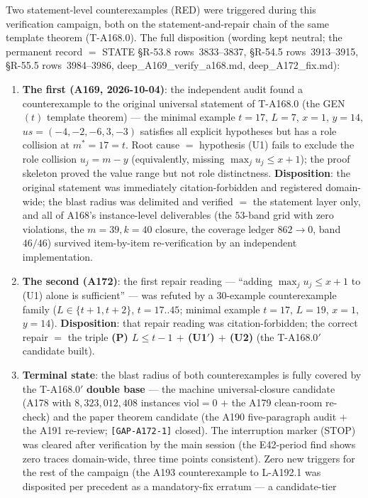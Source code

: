 Two statement-level counterexamples (RED) were triggered during this
verification campaign, both on the statement-and-repair chain of the same
template theorem (T-A168.0). The full disposition (wording kept neutral;
the permanent record $=$ STATE \S R-53.8 rows~3833--3837, \S R-54.5
rows~3913--3915, \S R-55.5 rows~3984--3986, deep\_A169\_verify\_a168.md,
deep\_A172\_fix.md):
\begin{enumerate}
\item \textbf{The first (A169, 2026-10-04)}: the independent audit found a
counterexample to the original universal statement of T-A168.0 (the
GEN$(t)$ template theorem) --- the minimal example $t=17$, $L=7$, $x=1$,
$y=14$, $us=(-4,-2,-6,3,-3)$ satisfies all explicit hypotheses but has a
role collision at $m^*=17=t$. Root cause $=$ hypothesis (U1) fails to
exclude the role collision $u_j=m-y$ (equivalently, missing
$\max_j u_j\le x+1$); the proof skeleton proved the value range but not
role distinctness. \textbf{Disposition}: the original statement was
immediately citation-forbidden and registered domain-wide; the blast radius
was delimited and verified $=$ the statement layer only, and all of A168's
instance-level deliverables (the $53$-band grid with zero violations, the
$m=39,k=40$ closure, the coverage ledger $862\to0$, band $46/46$) survived
item-by-item re-verification by an independent implementation.
\item \textbf{The second (A172)}: the first repair reading --- ``adding
$\max_j u_j\le x+1$ to (U1) alone is sufficient'' --- was refuted by a
$30$-example counterexample family ($L\in\{t+1,t+2\}$, $t=17..45$; minimal
example $t=17$, $L=19$, $x=1$, $y=14$). \textbf{Disposition}: that repair
reading was citation-forbidden; the correct repair $=$ the triple
\textbf{(P) $L\le t-1$ $+$ (U1$'$) $+$ (U2)} (the T-A168.0$'$ candidate
built).
\item \textbf{Terminal state}: the blast radius of both counterexamples is
fully covered by the T-A168.0$'$ \textbf{double base} --- the machine
universal-closure candidate (A178 with $8{,}323{,}012{,}408$ instances
viol$=0$ $+$ the A179 clean-room re-check) and the paper theorem candidate
(the A190 five-paragraph audit $+$ the A191 re-review;
\texttt{[GAP-A172-1]} closed). The interruption marker (STOP) was cleared
after verification by the main session (the E42-period find shows zero
traces domain-wide, three time points consistent). Zero new triggers for
the rest of the campaign (the A193 counterexample to L-A192.1 was
disposited per precedent as a mandatory-fix erratum --- a candidate-tier

\end{enumerate}
